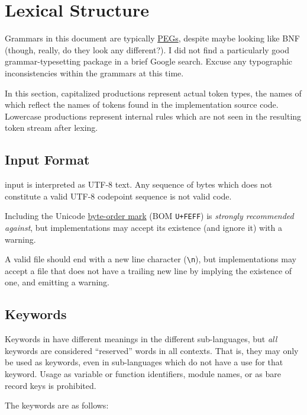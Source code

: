 \section{Lexical Structure}

Grammars in this document are typically
\href{https://en.wikipedia.org/wiki/Parsing_expression_grammar}{PEGs},
despite maybe looking like BNF (though, really, do they look any different?).
I did not find a particularly good grammar-typesetting package in a brief
Google search. Excuse any typographic inconsistencies within the grammars
at this time.

In this section, capitalized productions represent actual token types, the
names of which reflect the names of tokens found in the implementation source
code. Lowercase productions represent internal rules which are not seen in the
resulting token stream after lexing.

\subsection{Input Format}

\Trilogy{} input is interpreted as UTF-8 text. Any sequence of bytes which
does not constitute a valid UTF-8 codepoint sequence is not valid \Trilogy{}
code.

Including the Unicode \href{https://en.wikipedia.org/wiki/Byte_order_mark}{byte-order mark}
(BOM \texttt{U+FEFF}) is \emph{strongly recommended against}, but \Trilogy{}
implementations may accept its existence (and ignore it) with a warning.

A valid \Trilogy{} file should end with a new line character (\texttt{\textbackslash n}),
but \Trilogy{} implementations may accept a file that does not have
a trailing new line by implying the existence of one, and emitting a
warning.

\subsection{Keywords}

Keywords in \Trilogy{} have different meanings in the different
sub-languages, but \emph{all} keywords are considered ``reserved''
words in all contexts. That is, they may only be used as keywords,
even in sub-languages which do not have a use for that keyword.
Usage as variable or function identifiers, module names, or as
bare record keys is prohibited.

The keywords are as follows:

